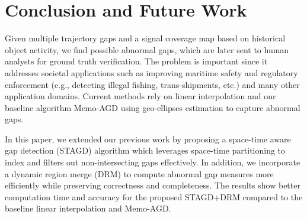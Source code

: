 \documentclass[acmsmall]{acmart}
\begin{document}

\section{Conclusion and Future Work}
\label{section:Conclusion_future_work}
Given multiple trajectory gaps and a signal coverage map based on historical object activity, we find
possible abnormal gaps, which are later sent to human analysts for ground truth verification. The problem is important since it addresses societal applications such as improving maritime safety and regulatory enforcement (e.g., detecting illegal fishing, trans-shipments, etc.) and many other application domains. Current methods rely on linear interpolation and our baseline algorithm Memo-AGD \cite{sharma2022abnormal} using geo-ellipses estimation to capture abnormal gaps. 

In this paper, we extended our previous work by proposing a space-time aware gap detection (STAGD) algorithm which leverages space-time partitioning to index and filters out non-intersecting gaps effectively. In addition, we incorporate a dynamic region merge (DRM) to compute abnormal gap measures more efficiently while preserving correctness and completeness. The results show better computation time and accuracy for the proposed STAGD+DRM compared to the baseline linear interpolation and Memo-AGD.
\end{document}
